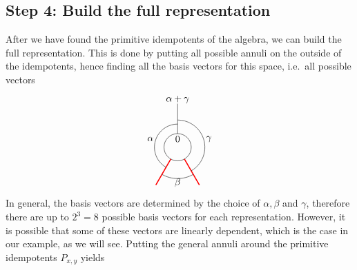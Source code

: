 \subsection*{Step 4: Build the full representation} After we have found the primitive idempotents of the algebra, we can build the full representation. This is done by putting all possible annuli on the outside of the idempotents, hence finding all the basis vectors for this space, i.e.\ all possible vectors
	\begin{equation}
		\begin{tikzpicture}[scale=1,baseline=(current bounding box.center)]
		\draw (0,0) circle (0.5cm);
		\draw[red,line width=0.4mm]
		\foreach \a in {-60, -120} {
			(\a:0.5) -- (\a:1.6)
		};
		\draw ([shift=(-60:1cm)]0,0) arc (-60:90:1cm);
		\draw ([shift=(-120:1.15cm)]0,0) arc (-120:-60:1.15cm);
		\draw ([shift=(240:0.85cm)]0,0) arc (240:90:0.85cm);
		\draw[] (90:0.5) -- (90:1.6);
		\node at (90:.3cm){$0$};\node at (90:1.75cm){$\alpha+\gamma$};
		\node at (-1,0.3) {$\alpha$};
		\node at (1.15,0.3) {$\gamma$};
		\node at (0,-1.3) {$\beta$};
		\end{tikzpicture}
	\end{equation}
In general, the basis vectors are determined by the choice of $\alpha,\beta$ and $\gamma$, therefore there are up to $2^3=8$ possible basis vectors for each representation. However, it is possible that some of these vectors are linearly dependent, which is the case in our example, as we will see. Putting the general annuli around the primitive idempotents $P_{x,y}$ yields
